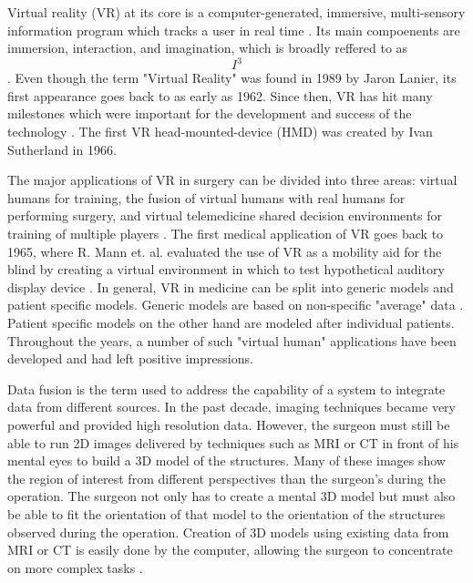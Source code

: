 Virtual reality (VR) at its core is a computer-generated, immersive, multi-sensory information program which tracks a user in real time \cite{burdea2003virtual}.
Its main compoenents are immersion, interaction, and imagination, which is broadly reffered to as \begin{equation}I^3\end{equation}.
Even though the term "Virtual Reality" was found in 1989 by Jaron Lanier, its first appearance goes back to as early as 1962.
Since then, VR has hit many milestones which were important for the development and success of the technology \cite{burdea2003virtual}.
The first VR head-mounted-device (HMD) was created by Ivan Sutherland in 1966.

The major applications of VR in surgery can be divided into three areas:
virtual humans for training, the fusion of virtual humans with real humans for performing surgery, 
and virtual telemedicine shared decision environments for training of multiple players \cite{486713}.
The first medical application of VR goes back to 1965, where R. Mann et. al. evaluated the use of VR as a mobility aid for the blind by creating a virtual environment in which to test hypothetical auditory display device  \cite{mann1965evaluation}.
In general, VR in medicine can be split into generic models and patient specific models.
Generic models are based on non-specific "average" data \cite{486713}.
\newline
Patient specific models on the other hand are modeled after individual patients.
Throughout the years, a number of such "virtual human" applications have been developed and had left positive impressions.

Data fusion is the term used to address the capability of a system to integrate data from different sources.
In the past decade, imaging techniques became very powerful and provided high resolution data.
However, the surgeon must still be able to run 2D images delivered by techniques such as MRI or CT in front of his mental eyes to build a 3D model of the structures.
Many of these images show the region of interest from different perspectives than the surgeon’s during the operation.
The surgeon not only has to create a mental 3D model but must also be able to fit the orientation of that model to the orientation of the structures observed during the operation.
Creation of 3D models using existing data from MRI or CT is easily done by the computer, allowing the surgeon to concentrate on more complex tasks \cite{486713}.


